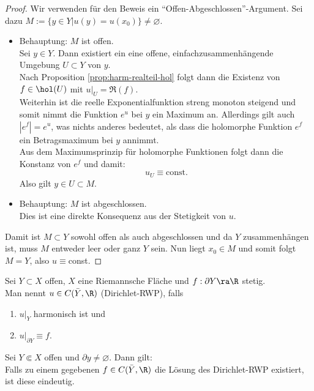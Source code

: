 \begin{proof}
  Wir verwenden für den Beweis ein
  "`Offen-Abgeschlossen"'-Argument. Sei dazu $M:= \{ y \in Y| u(y) =
  u(x_0)\} \neq \varnothing$. \\
  \begin{itemize}
  \item Behauptung: $M$ ist offen. \\
    Sei $y \in Y$. Dann existiert ein eine offene,
    einfachzusammenhängende Umgebung $U \subset Y$ von $y$. \\
    Nach Proposition \ref{prop:harm-realteil-hol} folgt dann die
    Existenz von $f \in \hol(U)$ mit $u|_U = \Re(f)$. \\
    Weiterhin ist die reelle Exponentialfunktion streng monoton
    steigend und somit nimmt die Funktion $e^u$ bei $y$ ein Maximum
    an. Allerdings gilt auch $|e^f| = e^u$, was nichts anderes
    bedeutet, als dass die holomorphe Funktion $e^f$ ein
    Betragsmaximum bei $y$ annimmt. \\
    Aus dem Maximumsprinzip für holomorphe Funktionen folgt dann die
    Konstanz von $e^f$ und damit:
    \[
    u_U \equiv \text{const.}
    \]
    Also gilt $y \in U \subset M$.
  \item Behauptung: $M$ ist abgeschlossen. \\
    Dies ist eine direkte Konsequenz aus der Stetigkeit von $u$.
  \end{itemize}
  Damit ist $M \subset Y$ sowohl offen als auch abgeschlossen und da
  $Y$ zusammenhängen ist, muss $M$ entweder leer oder ganz $Y$
  sein. Nun liegt $x_0 \in M$ und somit folgt $M = Y$, also $u \equiv$const.
\end{proof}

\begin{defin}
  Sei $Y\subset X$ offen, $X$ eine Riemannsche Fläche und $f: \partial
  Y \ra \R$ stetig. \\
  Man nennt $u \in C(\bar Y, \R)$  (Dirichlet-RWP), falls
  \begin{enumerate}
  \item $u|_Y$ harmonisch ist und
  \item $u|_{\partial Y} \equiv f$.
  \end{enumerate}
\end{defin}

\begin{prop}
  \label{prop:dirichlet-eindeutig}
  Sei $Y \Subset X$ offen und $\partial y \neq \varnothing$. Dann gilt:\\
  Falls zu einem gegebenen $f \in C(\bar Y, \R)$ die Lösung des
  Dirichlet-RWP existiert, ist diese eindeutig.
\end{prop}

